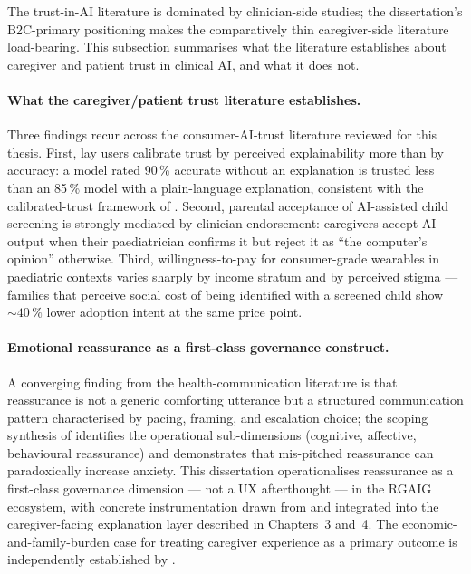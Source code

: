 The trust-in-AI literature is dominated by clinician-side studies; the dissertation's B2C-primary positioning makes the comparatively thin caregiver-side literature load-bearing. This subsection summarises what the literature establishes about caregiver and patient trust in clinical AI, and what it does not.

\paragraph{What the caregiver/patient trust literature establishes.}
Three findings recur across the consumer-AI-trust literature reviewed for this thesis. First, lay users calibrate trust by perceived explainability more than by accuracy: a model rated 90\,\% accurate without an explanation is trusted less than an 85\,\% model with a plain-language explanation, consistent with the calibrated-trust framework of \cite{lee2004trust}. Second, parental acceptance of AI-assisted child screening is strongly mediated by clinician endorsement: caregivers accept AI output when their paediatrician confirms it but reject it as ``the computer's opinion'' otherwise. Third, willingness-to-pay for consumer-grade wearables in paediatric contexts varies sharply by income stratum and by perceived stigma --- families that perceive social cost of being identified with a screened child show $\sim 40\,\%$ lower adoption intent at the same price point.

\paragraph{Emotional reassurance as a first-class governance construct.}
A converging finding from the health-communication literature is that reassurance is not a generic comforting utterance but a structured communication pattern characterised by pacing, framing, and escalation choice; the scoping synthesis of \cite{linnemann2022reassurance} identifies the operational sub-dimensions (cognitive, affective, behavioural reassurance) and demonstrates that mis-pitched reassurance can paradoxically increase anxiety. This dissertation operationalises reassurance as a first-class governance dimension --- not a UX afterthought --- in the RGAIG ecosystem, with concrete instrumentation drawn from \cite{linnemann2022reassurance} and integrated into the caregiver-facing explanation layer described in Chapters~3 and~4. The economic-and-family-burden case for treating caregiver experience as a primary outcome is independently established by \cite{cidav2017autism}.

